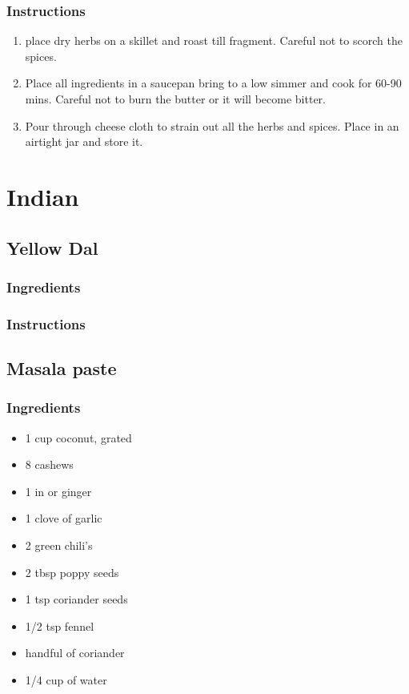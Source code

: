 \documentclass[11pt]{article}
\begin{document}
\subsubsection*{Instructions}
\label{sec:orgfb10b50}
\begin{enumerate}
\item place dry herbs on a skillet and roast till fragment. Careful not to scorch the spices.
\item Place all ingredients in a saucepan bring to a low simmer and cook for 60-90 mins. Careful not to burn the butter or it will become bitter.
\item Pour through cheese cloth to strain out all the herbs and spices. Place in an airtight jar and store it.
\end{enumerate}
\section{Indian}
\label{sec:org2f164fa}
\subsection{Yellow Dal}
\label{sec:org9250612}
\subsubsection*{Ingredients}
\label{sec:org33d5ed3}
\subsubsection*{Instructions}
\label{sec:org14d71e0}
\subsection{Masala paste}
\label{sec:org1cac159}
\subsubsection*{Ingredients}
\label{sec:orgb658f07}
\begin{itemize}
\item 1 cup coconut, grated
\item 8 cashews
\item 1 in or ginger
\item 1 clove of garlic
\item 2 green chili's
\item 2 tbsp poppy seeds
\item 1 tsp coriander seeds
\item 1/2 tsp fennel
\item handful of coriander
\item 1/4 cup of water
\end{itemize}
\end{document}
